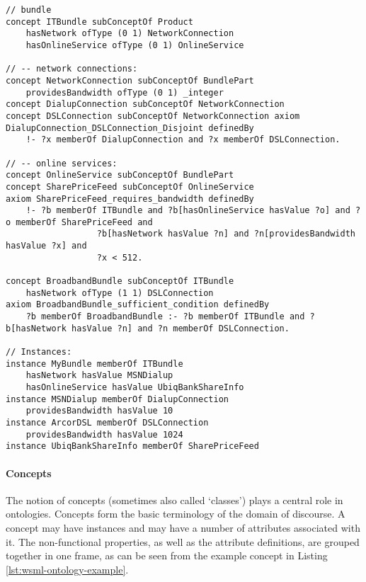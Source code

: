 \begin{lstlisting}[label=lst:wsml-ontology-example,style=wsml]
// bundle
concept ITBundle subConceptOf Product
    hasNetwork ofType (0 1) NetworkConnection
    hasOnlineService ofType (0 1) OnlineService

// -- network connections:
concept NetworkConnection subConceptOf BundlePart
    providesBandwidth ofType (0 1) _integer
concept DialupConnection subConceptOf NetworkConnection
concept DSLConnection subConceptOf NetworkConnection axiom
DialupConnection_DSLConnection_Disjoint definedBy
    !- ?x memberOf DialupConnection and ?x memberOf DSLConnection.

// -- online services:
concept OnlineService subConceptOf BundlePart
concept SharePriceFeed subConceptOf OnlineService
axiom SharePriceFeed_requires_bandwidth definedBy
    !- ?b memberOf ITBundle and ?b[hasOnlineService hasValue ?o] and ?o memberOf SharePriceFeed and
                  ?b[hasNetwork hasValue ?n] and ?n[providesBandwidth hasValue ?x] and
                  ?x < 512.

concept BroadbandBundle subConceptOf ITBundle
    hasNetwork ofType (1 1) DSLConnection
axiom BroadbandBundle_sufficient_condition definedBy
    ?b memberOf BroadbandBundle :- ?b memberOf ITBundle and ?b[hasNetwork hasValue ?n] and ?n memberOf DSLConnection.

// Instances:
instance MyBundle memberOf ITBundle
    hasNetwork hasValue MSNDialup
    hasOnlineService hasValue UbiqBankShareInfo
instance MSNDialup memberOf DialupConnection
    providesBandwidth hasValue 10
instance ArcorDSL memberOf DSLConnection
    providesBandwidth hasValue 1024
instance UbiqBankShareInfo memberOf SharePriceFeed
\end{lstlisting}

\paragraph{Concepts}
The notion of concepts (sometimes also called `classes') plays a
central role in ontologies. Concepts form the basic terminology of
the domain of discourse. A concept may have instances and may have a
number of attributes associated with it. The non-functional
properties, as well as the attribute definitions, are grouped
together in one frame, as can be seen from the example concept
 in Listing \ref{lst:wsml-ontology-example}.

